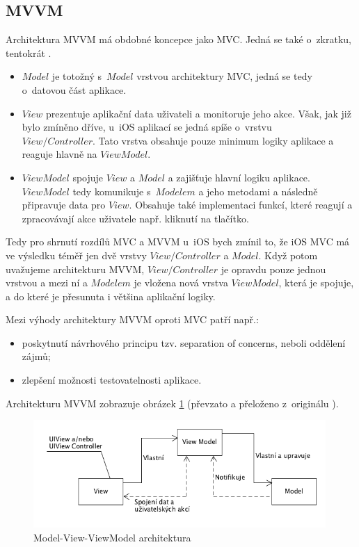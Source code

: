 \documentclass[thesis=M,czech]{FITthesis}[2012/06/26]
\begin{document}
\subsection{MVVM}
Architektura MVVM má obdobné koncepce jako MVC. Jedná se také o~zkratku, tentokrát . \cite{MVVMMicrosoft}
\begin{itemize}
\item $Model$ je totožný s~$Model$ vrstvou architektury MVC, jedná se tedy o~datovou část aplikace.
\item $View$ prezentuje aplikační data uživateli a monitoruje jeho akce. Však, jak již bylo zmíněno dříve, u~iOS aplikací se jedná spíše o~vrstvu\\ $View/Controller$. Tato vrstva obsahuje pouze minimum logiky aplikace a reaguje hlavně na $ViewModel$.  \cite{Morrison}
\item $ViewModel$ spojuje $View$ a $Model$ a zajišťuje hlavní logiku aplikace. $ViewModel$ tedy komunikuje s~$Modelem$ a jeho metodami a následně připravuje data pro $View$. Obsahuje také implementaci funkcí, které reagují a zpracovávají akce uživatele např. kliknutí na tlačítko. \cite{MVVMMicrosoft}
\end{itemize}

Tedy pro shrnutí rozdílů MVC a MVVM u~iOS bych zmínil to, že iOS MVC má ve výsledku téměř jen dvě vrstvy $View/Controller$ a $Model$. Když potom uvažujeme architekturu MVVM, $View/Controller$  je opravdu pouze jednou vrstvou a mezi ní a $Modelem$ je vložena nová vrstva $ViewModel$, která je spojuje, a do které je přesunuta i většina aplikační logiky.

Mezi výhody architektury MVVM oproti MVC patří např.:
\begin{itemize}
\item poskytnutí návrhového principu tzv. separation of concerns, neboli oddělení zájmů;
\item zlepšení možnosti testovatelnosti aplikace.
\end{itemize}

Architekturu MVVM zobrazuje obrázek \ref{fig:mvvm} (převzato a přeloženo z~originálu \cite{mvvm-pic}).

\begin{figure}[h]\centering
 \includegraphics[width=0.99\textwidth]{./pictures/architektury/MVVM}
 \caption[Model-View-ViewModel architektura]{Model-View-ViewModel architektura}\label{fig:mvvm}
\end{figure}
\end{document}
